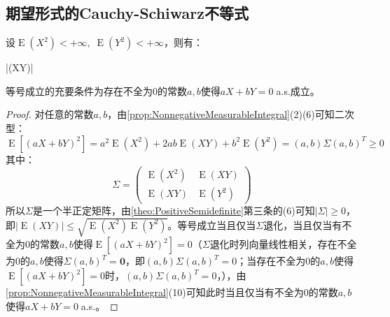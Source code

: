 \subsection{期望形式的Cauchy-Schiwarz不等式}
\begin{theorem}
	设$\operatorname{E}(X^2)<+\infty,\;\operatorname{E}(Y^2)<+\infty$，则有：
	\begin{inequality*}\label{ineq:cauchy-schiwarz-expectations}
		|(XY)|\leqslant{}
	\end{inequality*}
	等号成立的充要条件为存在不全为$0$的常数$a,b$使得$aX+bY=0\;$a.s.成立。
\end{theorem}
\begin{proof}
	对任意的常数$a,b$，由\cref{prop:NonnegativeMeasurableIntegral}(2)(6)可知二次型：
	\begin{equation*}
		\operatorname{E}[(aX+bY)^2]=a^2\operatorname{E}(X^2)+2ab\operatorname{E}(XY)+b^2\operatorname{E}(Y^2)=(a,b)\Sigma(a,b)^T\geqslant0
	\end{equation*}
	其中：
	\begin{equation*}
		\Sigma=
		\begin{pmatrix}
			\operatorname{E}(X^2) & \operatorname{E}(XY) \\
			\operatorname{E}(XY) & \operatorname{E}(Y^2)
		\end{pmatrix}
	\end{equation*}
	所以$\Sigma$是一个半正定矩阵，由\cref{theo:PositiveSemidefinite}第三条的(6)可知$|\Sigma|\geqslant0$，即$|\operatorname{E}(XY)|\leqslant\sqrt{\operatorname{E}(X^2)\operatorname{E}(Y^2)}$。等号成立当且仅当$\Sigma$退化，当且仅当有不全为$0$的常数$a,b$使得$\operatorname{E}[(aX+bY)^2]=0$（$\Sigma$退化时列向量线性相关，存在不全为$0$的$a,b$使得$\Sigma(a,b)^T=\mathbf{0}$，即$(a,b)\Sigma(a,b)^T=0$；当存在不全为$0$的$a,b$使得$\operatorname{E}[(aX+bY)^2]=0$时，$(a,b)\Sigma(a,b)^T=0$，），由\cref{prop:NonnegativeMeasurableIntegral}(10)可知此时当且仅当有不全为$0$的常数$a,b$使得$aX+bY=0\;$a.s.。
\end{proof}

